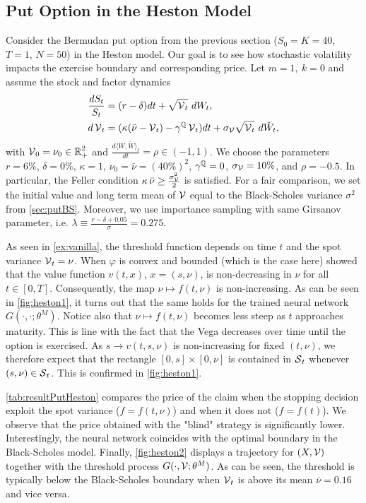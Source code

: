 \subsection{Put Option in the Heston Model}\label{sec:putHeston}

Consider the Bermudan put option from the previous section ($S_0 =K=40$, $T=1$, $N=50$) in the Heston model. Our goal is to see how stochastic volatility impacts the exercise boundary and  corresponding  price.   
 Let $m=1, \ k=0$ and assume the stock and factor dynamics
\begin{align*}
   \frac{dS_t}{S_t} &= (r-\delta)dt + \sqrt{\operatorname{\mathcal{V}}_t}\  dW_t, \\
   d\operatorname{\mathcal{V}}_t &= (\kappa(\bar{\nu}-\operatorname{\mathcal{V}}_t) - \gamma^{\operatorname{\mathbb{Q}}}\operatorname{\mathcal{V}}_t)dt + \sigma_{\operatorname{\mathcal{V}}} \sqrt{\operatorname{\mathcal{V}}_t}\  d\tilde{W}_t, 
\end{align*}
with $\operatorname{\mathcal{V}}_0 = \nu_0 \in \operatorname{\mathbb{R}}^2_+$ and $\frac{d\langle W, \tilde{W} \rangle_t}{dt} = \rho  \in  (-1,1)$. 
We choose the parameters
 $r = 6\%$, $\delta = 0\%$, $\kappa = 1$, $\nu_0 = \bar{\nu} = (40\%)^2$, $\gamma^{\operatorname{\mathbb{Q}}} =0$, $\sigma_{\operatorname{\mathcal{V}}} =10\%$, and $\rho =-0.5$. In particular, 
the Feller condition $\kappa \,  \bar{\nu} \ge  \frac{\sigma_{\operatorname{\mathcal{V}}}^2}{2}$ is satisfied.  
For a fair comparison,  we set the initial value and long term mean of $\operatorname{\mathcal{V}}$ equal to the Black-Scholes variance $\sigma^2$ from \cref{sec:putBS}.   Moreover, we use importance sampling with same Girsanov parameter, i.e. $\lambda \equiv \frac{r-\delta + 0.05}{\sigma}  = 0.275$.

As seen in \cref{ex:vanilla}, the threshold function 
depends on time $t$ and the spot variance $\operatorname{\mathcal{V}}_t =\nu$.  
When $\varphi$ is convex and bounded (which is the case here)   \citet{LambertonHeston} showed that the value function $v(t,x)$, $x=(s,\nu)$, is  non-decreasing in $\nu$ for all $t\in [0,T]$. Consequently, the map $\nu \mapsto f(t,\nu)$ is non-increasing. As can be seen in  \cref{fig:heston1}, it turns out that the same holds for the trained neural network $G(\cdot,\cdot;\theta^M)$.
Notice also that $\nu \mapsto f(t,\nu)$ becomes less steep as $t$ approaches maturity. This is line with the fact that the Vega  decreases over time until the option is exercised.  
As $s \to v(t,s,\nu)$ is non-increasing for fixed $(t,\nu)$,  we therefore expect that the  rectangle $[0,s]\times [0,\nu]$ 
is contained in $\operatorname{\mathcal{S}}_t$ whenever $(s,\nu) \in \operatorname{\mathcal{S}}_t$. This is confirmed in  \cref{fig:heston1}. 

 \cref{tab:resultPutHeston} compares the price of the claim when the stopping decision exploit the spot variance ($f = f(t,\nu)$) and when it does not ($f = f(t)$). We observe that the price obtained with the "blind" strategy is significantly lower. Interestingly, the neural network coincides with the optimal boundary in the Black-Scholes model. %
 Finally, \cref{fig:heston2} displays a trajectory for $(X,\operatorname{\mathcal{V}})$ together with the threshold process $G(\cdot,\operatorname{\mathcal{V}};\theta^M)$. As can be seen, the threshold is typically below the Black-Scholes boundary when $\operatorname{\mathcal{V}}_t$ is above its mean $\bar{\nu} = 0.16$ and vice versa. 

